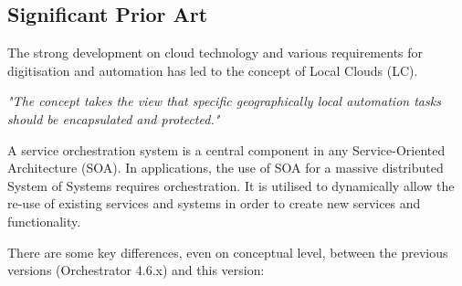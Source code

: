 \documentclass[a4paper]{arrowhead}
\begin{document}
\subsection{Significant Prior Art}
\label{sec:prior_art}

The strong development on cloud technology and various requirements for digitisation and automation has led to the concept of Local Clouds (LC).

\textit{"The concept takes the view that specific geographically local automation tasks should be encapsulated and protected."} \cite{jerker2017localclouds}

A service orchestration system is a central component in any Service-Oriented Architecture (SOA). In applications, the use of SOA for a massive distributed System of Systems requires orchestration. It is utilised to dynamically allow the re-use of existing services and systems in order to create new services and functionality. 

There are some key differences, even on conceptual level, between the previous versions (Orchestrator 4.6.x) and this version:
\end{document}
